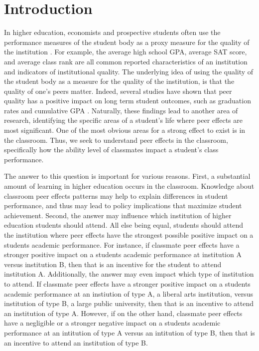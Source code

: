 \documentclass[12pt,letterpaper,english,fleqn]{article}
\date{March 2016}
\begin{document}

\doublespacing





\section{Introduction}\label{intro}

In higher education, economists and prospective students often use the performance measures of the student body as a proxy measure for the quality of the institution \citep{smith2015new,sarmiento2015quality,black2006estimating}.
For example, the average high school GPA, average SAT score, and average class rank are all common reported characteristics of an institution and indicators of institutional quality.
The underlying idea of using the quality of the student body as a measure for the quality of the institution, is that the quality of one's peers matter. 
Indeed, several studies have shown that peer quality has a positive impact on long term student outcomes, such as graduation rates and cumulative GPA \citep{smith2015new,luppino2015college,ost2010role}. 
Naturally, these findings lead to another area of research, identifying the specific areas of a student's life where peer effects are most significant. 
One of the most obvious areas for a strong effect to exist is in the classroom.
Thus, we seek to understand peer effects in the classroom, specifically how the ability level of classmates impact a student's class performance.

The answer to this question is important for various reasons. 
First, a substantial amount of learning in higher education occurs in the classroom. 
Knowledge about classroom peer effects patterns may help to explain differences in student performance, and thus may lead to policy implications that maximize student achievement. 
Second, the answer may influence which institution of higher education students should attend. 
All else being equal, students should attend the institution where peer effects have the strongest possible positive impact on a students academic performance. 
For instance, if classmate peer effects have a stronger positive impact on a students academic performance at institution A versus institution B, then that is an incentive for the student to attend institution A. 
Additionally, the answer may even impact which type of institution to attend.
If classmate peer effects have a stronger positive impact on a students academic performance at an instiution of type A, a liberal arts institution, versus institution of type B, a large public university, then that is an incentive to attend an institution of type A. 
However, if on the other hand, classmate peer effects have a negligible or a stronger negative impact on a students academic performance at an intitution of type A versus an intitution of type B, then that is an incentive to attend an institution of type B. 
\end{document}
